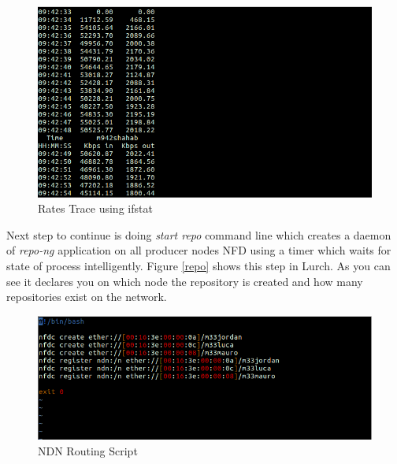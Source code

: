 \begin{figure}[H]

\begin{center}

\includegraphics[scale = 0.35]{Pictures/data.png}

\caption{Rates Trace using ifstat} \label{data} 

\end{center}

\end{figure}
 
 
 
Next step to continue is doing \textit{start repo} command line which creates a daemon of \textit{repo-ng} application on all producer nodes NFD using a timer which waits for state of process intelligently. Figure \ref{repo} shows this step in Lurch. As you can see it declares you on which node the repository is created and how many repositories exist on the network.



\begin{figure}[H]

\begin{center}

\includegraphics[scale = 0.35]{Pictures/script.png}

\caption{NDN Routing Script} \label{script} 

\end{center}

\end{figure}


